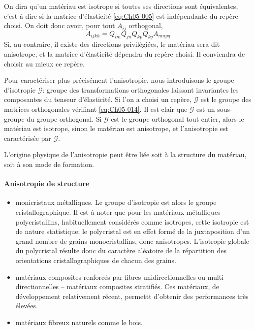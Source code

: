 On dira qu'un matériau est isotrope si toutes ses directions sont équivalentes, c'est à dire si la matrice d'élasticité \eqref{eq:Ch05-005} est indépendante du repère choisi.
On doit donc avoir, pour tout $A_{ij}$ orthogonal,
\begin{equation}
    A_{ijkh} = Q_{im} Q_{jn} Q_{kp} Q_{kq} A_{mnpq}
    \label{eq:Ch05-014}
\end{equation}
Si, au contraire, il existe des directions privilégiées, le matériau sera dit anisotrope, et la matrice d'élasticité dépendra du repère choisi.
Il conviendra de choisir au mieux ce repère.

Pour caractériser plus précisément l'anisotropie, nous introduisons le groupe d'isotropie $\mathcal{G}$: groupe des transformations orthogonales laissant invariantes les composantes du tenseur d'élasticité.
Si l'on a choisi un repère, $\mathcal{G}$ est le groupe des matrices orthogonales vérifiant \eqref{eq:Ch05-014}.
Il est clair que $\mathcal{G}$ est un sous-groupe du groupe orthogonal.
Si $\mathcal{G}$ est le groupe orthogonal tout entier, alors le matériau est isotrope, sinon le matériau est anisotrope, et l'anisotropie est caractérisée par $\mathcal{G}$.

L'origine physique de l'anisotropie peut être liée soit à la structure du matériau, soit à son mode de formation. 

\paragraph{Anisotropie de structure}
\begin{itemize}
    \item monicristaux métalliques.
        Le groupe d'isotropie est alors le groupe cristallographique.
        Il est à noter que pour les matériaux métalliques polycristallins, habituellement considérés comme isotropes, cette isotropie est de nature statistique; le polycristal est en effet formé de la juxtaposition d'un grand nombre de grains monocristallins, donc anisotropes.
        L'isotropie globale du polycristal résulte donc du caractère aléatoire de la répartition des orientations cristallographiques de chacun des grains.
    \item matériaux composites renforcés par fibres unidirectionnelles ou multi­directionnelles -- matériaux composites stratifiés.
        Ces matériaux, de développement relativement récent, permettt d'obtenir des performances très élevées.
    \item matériaux fibreux naturels comme le bois.
\end{itemize}

